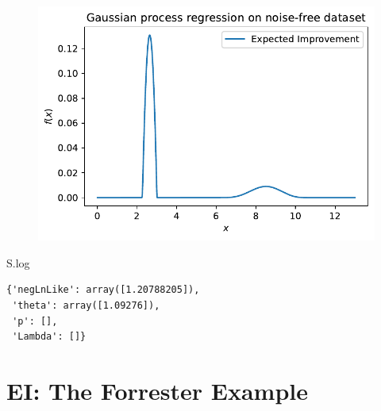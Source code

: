 \documentclass[
  letterpaper,
  DIV=11,
  numbers=noendperiod]{scrreprt}
\newenvironment{Shaded}{\begin{snugshade}}{\end{snugshade}}
\newcommand{\NormalTok}[1]{\textcolor[rgb]{0.00,0.23,0.31}{#1}}
\begin{document}
\begin{figure}[H]

{\centering \includegraphics{07_spot_ei_files/figure-pdf/cell-46-output-1.pdf}

}

\end{figure}

\begin{Shaded}
\begin{Highlighting}[]
\NormalTok{S.log}
\end{Highlighting}
\end{Shaded}

\begin{verbatim}
{'negLnLike': array([1.20788205]),
 'theta': array([1.09276]),
 'p': [],
 'Lambda': []}
\end{verbatim}

\hypertarget{ei-the-forrester-example}{%
\section{EI: The Forrester Example}\label{ei-the-forrester-example}}
\end{document}

